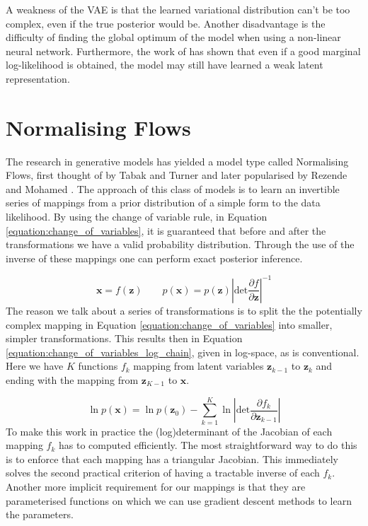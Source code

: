 \documentclass{report}
\newcommand{\bx}{\mathbf{x}}
\newcommand{\bz}{\mathbf{z}}
\newcommand{\parfrac}[2]{\frac{\partial #1}{\partial#2}}
\begin{document}
A weakness of the VAE is that the learned variational distribution can't be too complex, even if the true posterior would be. Another disadvantage is the difficulty of finding the global optimum of the model when using a non-linear neural network. Furthermore, the work of \cite{alemi2017fixing} has shown that even if a good marginal log-likelihood is obtained, the model may still have learned a weak latent representation.

\section{Normalising Flows}
The research in generative models has yielded a model type called Normalising Flows, first thought of by Tabak and Turner \cite{tabak2013family} and later popularised by Rezende and Mohamed \cite{rezende2016variational}. The approach of this class of models is to learn an invertible series of mappings from a prior distribution of a simple form to the data likelihood. By using the change of variable rule, in Equation \ref{equation:change_of_variables}, it is guaranteed that before and after the transformations we have a valid probability distribution. Through the use of the inverse of these mappings one can perform exact posterior inference. 

\begin{equation}\label{equation:change_of_variables}
    \bx = f(\bz) \qquad p(\bx) = p(\bz) \left|\text{det} \parfrac{f}{\bz} \right|^{-1}
\end{equation}
The reason we talk about a series of transformations is to split the the potentially complex mapping in Equation \ref{equation:change_of_variables} into smaller, simpler transformations. This results then in Equation \ref{equation:change_of_variables_log_chain}, given in log-space, as is conventional. Here we have $K$ functions $f_k$ mapping from latent variables $\bz_{k-1}$ to $\bz_k$ and ending with the mapping from $\bz_{K-1}$ to $\bx$.

\begin{equation}\label{equation:change_of_variables_log_chain}
    \ln p(\bx) = \ln p(\bz_0) - \sum\limits^K_{k=1}\ln \left| \text{det} \parfrac{f_k}{\bz_{k-1}} \right|
\end{equation}
To make this work in practice the (log)determinant of the Jacobian of each mapping $f_k$ has to computed efficiently. The most straightforward way to do this is to enforce that each mapping has a triangular Jacobian. This immediately solves the second practical criterion of having a tractable inverse of each $f_k$. Another more implicit requirement for our mappings is that they are parameterised functions on which we can use gradient descent methods to learn the parameters. 
\end{document}
